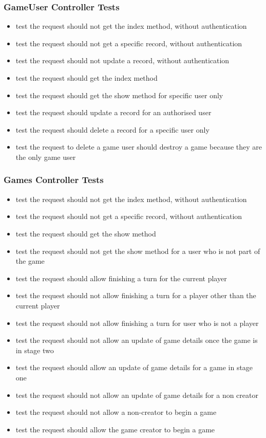 \subsubsection{GameUser Controller Tests}
\begin{itemize}
	\item test the request should not get the index method, without authentication
	\item test the request should not get a specific record, without authentication
	\item test the request should not update a record, without authentication
	\item test the request should get the index method
	\item test the request should get the show method for specific user only
	\item test the request should update a record for an authorised user
	\item test the request should delete a record for a specific user only
	\item test the request to delete a game user should destroy a game because they are the only game user
\end{itemize}

\subsubsection{Games Controller Tests}
\begin{itemize}
	\item test the request should not get the index method, without authentication
	\item test the request should not get a specific record, without authentication
	\item test the request should get the show method
	\item test the request should not get the show method for a user who is not part of the game
	\item test the request should allow finishing a turn for the current player
	\item test the request should not allow finishing a turn for a player other than the current player
	\item test the request should not allow finishing a turn for user who is not a player
	\item test the request should not allow an update of game details once the game is in stage two
	\item test the request should allow an update of game details for a game in stage one
	\item test the request should not allow an update of game details for a non creator
	\item test the request should not allow a non-creator to begin a game
	\item test the request should allow the game creator to begin a game
\end{itemize}

